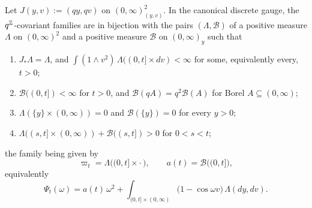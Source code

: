 \begin{theorem}
\label{thm:surface-measure}

Let $J(y,v) := (qy, qv)$ on $(0,\infty)^2_{(y,v)}$. In the canonical discrete gauge, the
$q^{\mathbb{Z}}$-covariant families are in bijection with the pairs $(\Lambda, \mathcal{B})$ of a positive
measure $\Lambda$ on $(0,\infty)^2$ and a positive measure $\mathcal{B}$ on $(0,\infty)_y$ such that
\begin{enumerate}
\item[(i)] $J_*\Lambda = \Lambda$, and $\int(1 \wedge v^2)\,\Lambda((0,t] \times dv) < \infty$ for
some, equivalently every, $t > 0$;
\item[(ii)] $\mathcal{B}((0,t]) < \infty$ for $t > 0$, and $\mathcal{B}(qA) = q^2\mathcal{B}(A)$ for
Borel $A \subseteq (0,\infty)$;
\item[(iii)] $\Lambda(\{y\} \times (0,\infty)) = 0$ and $\mathcal{B}(\{y\}) = 0$ for every $y > 0$;
\item[(iv)] $\Lambda((s,t] \times (0,\infty)) + \mathcal{B}((s,t]) > 0$ for $0 < s < t$;
\end{enumerate}
the family being given by
\begin{equation}\label{eq:line-e1}
  \varpi_t = \Lambda\bigl((0,t] \times \cdot\,\bigr), \qquad a(t) = \mathcal{B}\bigl((0,t]\bigr),
\end{equation}
equivalently
\begin{equation}\label{eq:line-e2}
  \Psi_t(\omega) = a(t)\,\omega^2 + \int_{(0,t] \times (0,\infty)}\bigl(1 - \cos\omega v\bigr)\,
  \Lambda(dy, dv).
\end{equation}
\end{theorem}

